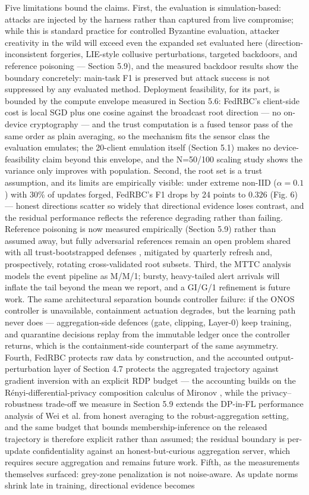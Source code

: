 \documentclass[cmc,article,submit,moreauthors,pdftex]{Definitions/tsp}
\begin{document}
Five limitations bound the claims. First, the evaluation is simulation-based: attacks are injected by the harness rather than captured from live compromise; while this is standard practice for controlled Byzantine evaluation, attacker creativity in the wild will exceed even the expanded set evaluated here (direction-inconsistent forgeries, LIE-style collusive perturbations, targeted backdoors, and reference poisoning --- Section 5.9), and the measured backdoor results show the boundary concretely: main-task F1 is preserved but attack success is not suppressed by any evaluated method. Deployment feasibility, for its part, is bounded by the compute envelope measured in Section 5.6: FedRBC's client-side cost is local SGD plus one cosine against the broadcast root direction --- no on-device cryptography --- and the trust computation is a fused tensor pass of the same order as plain averaging, so the mechanism fits the sensor class the evaluation emulates; the 20-client emulation itself (Section 5.1) makes no device-feasibility claim beyond this envelope, and the N=50/100 scaling study shows the variance only improves with population. Second, the root set is a trust assumption, and its limits are empirically visible: under extreme non-IID ($\alpha=0.1$) with 30\% of updates forged, FedRBC's F1 drops by 24 points to $0.326$ (Fig. 6) --- honest directions scatter so widely that directional evidence loses contrast, and the residual performance reflects the reference degrading rather than failing. Reference poisoning is now measured empirically (Section 5.9) rather than assumed away, but fully adversarial references remain an open problem shared with all trust-bootstrapped defenses \cite{ref-37}, mitigated by quarterly refresh and, prospectively, rotating cross-validated root subsets. Third, the MTTC analysis models the event pipeline as M/M/1; bursty, heavy-tailed alert arrivals will inflate the tail beyond the mean we report, and a GI/G/1 refinement is future work. The same architectural separation bounds controller failure: if the ONOS controller is unavailable, containment actuation degrades, but the learning path never does --- aggregation-side defences (gate, clipping, Layer-0) keep training, and quarantine decisions replay from the immutable ledger once the controller returns, which is the containment-side counterpart of the same asymmetry. Fourth, FedRBC protects raw data by construction, and the accounted output-perturbation layer of Section 4.7 protects the aggregated trajectory against gradient inversion with an explicit RDP budget --- the accounting builds on the Rényi-differential-privacy composition calculus of Mironov \cite{ref-55}, while the privacy--robustness trade-off we measure in Section 5.9 extends the DP-in-FL performance analysis of Wei et al. \cite{ref-56} from honest averaging to the robust-aggregation setting, and the same budget that bounds membership-inference on the released trajectory is therefore explicit rather than assumed; the residual boundary is per-update confidentiality against an honest-but-curious aggregation server, which requires secure aggregation and remains future work. Fifth, as the measurements themselves surfaced: grey-zone penalization is not noise-aware. As update norms shrink late in training, directional evidence becomes 
\end{document}
